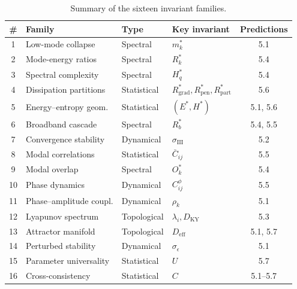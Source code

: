 \documentclass[11pt,twoside,openright]{book}
\theoremstyle{definition}
\theoremstyle{plain}
\theoremstyle{definition}
\theoremstyle{remark}
\begin{document}
\begin{table}[ht]
\centering
\caption{Summary of the sixteen invariant families.}\label{tab:invariants}
\small
\begin{tabular}{@{}clllc@{}}
\toprule
\# & Family & Type & Key invariant & Predictions \\
\midrule
1  & Low-mode collapse       & Spectral    & \(m_k^*\)                                                 & 5.1 \\
2  & Mode-energy ratios      & Spectral    & \(R_k^*\)                                                 & 5.4 \\
3  & Spectral complexity     & Spectral    & \(H_q^*\)                                                 & 5.4 \\
4  & Dissipation partitions  & Statistical & \(R_{\mathrm{grad}}^*,R_{\mathrm{pen}}^*,R_{\mathrm{part}}^*\) & 5.6 \\
5  & Energy--entropy geom.   & Statistical & \((E^*,H^*)\)                                             & 5.1, 5.6 \\
6  & Broadband cascade       & Spectral    & \(R_b^*\)                                                 & 5.4, 5.5 \\
7  & Convergence stability   & Dynamical   & \(\sigma_{\mathrm{III}}\)                                 & 5.2 \\
8  & Modal correlations      & Statistical & \(\bar{C}_{ij}\)                                          & 5.5 \\
9  & Modal overlap           & Spectral    & \(O_k^*\)                                                 & 5.4 \\
10 & Phase dynamics          & Dynamical   & \(C_{ij}^\phi\)                                           & 5.5 \\
11 & Phase--amplitude coupl. & Dynamical   & \(\rho_k\)                                                & 5.1 \\
12 & Lyapunov spectrum       & Topological & \(\lambda_i, D_{\mathrm{KY}}\)                            & 5.3 \\
13 & Attractor manifold      & Topological & \(D_{\mathrm{eff}}\)                                      & 5.1, 5.7 \\
14 & Perturbed stability     & Dynamical   & \(\sigma_\epsilon\)                                       & 5.1 \\
15 & Parameter universality  & Statistical & \(U\)                                                     & 5.7 \\
16 & Cross-consistency       & Statistical & \(C\)                                                     & 5.1--5.7 \\
\bottomrule
\end{tabular}
\end{table}
\end{document}
